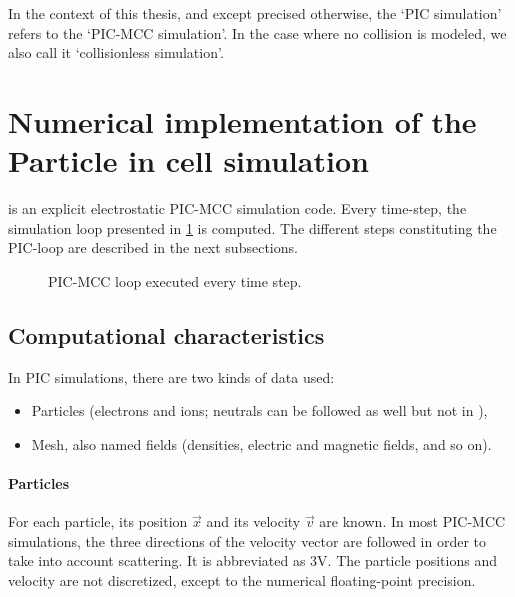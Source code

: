     In the context of this thesis, and except precised otherwise, the `\ac{PIC} simulation' refers to the `\ac{PIC}-\ac{MCC} simulation'.
    In the case where no collision is modeled, we also call it `collisionless simulation'.
\section{Numerical implementation of the Particle in cell simulation}

  \LPPic is an explicit electrostatic \ac{PIC}-\ac{MCC} simulation code.
  Every time-step, the simulation loop presented in \cref{fig-picloop} is computed.
  The different steps constituting the PIC-loop are described in the next subsections.
  \begin{figure}[hbt]
    \centering
    \caption{\acs{PIC}-\acs{MCC} loop executed every time step.}
    \label{fig-picloop}
  \end{figure}


  \subsection{Computational characteristics}
    In \ac{PIC} simulations, there are two kinds of data used\string:
    \begin{itemize}
      \item Particles (electrons and ions; neutrals can be followed as well but not in \LPPic),
      \item Mesh, also named fields (densities, electric and magnetic fields, and so on).
    \end{itemize}


    \paragraph{Particles\\}
    For each particle, its position $\vec{x}$ and its velocity $\vec{v}$ are known.
    In most \ac{PIC}-\ac{MCC} simulations, the three directions of the velocity vector are followed in order to take into account scattering.
    It is abbreviated as \acs{3V}.
    The particle positions and velocity are not discretized, except to the numerical floating-point precision.

